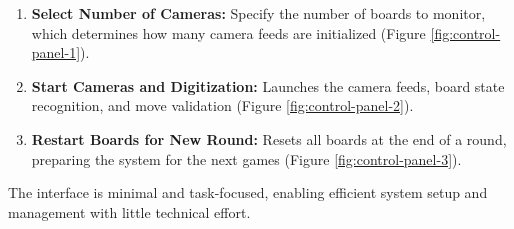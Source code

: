 \begin{enumerate}
\item \textbf{Select Number of Cameras:} Specify the number of boards to monitor, which determines how many camera feeds are initialized (Figure \ref{fig:control-panel-1}).
\item \textbf{Start Cameras and Digitization:} Launches the camera feeds, board state recognition, and move validation (Figure \ref{fig:control-panel-2}).
\item \textbf{Restart Boards for New Round:} Resets all boards at the end of a round, preparing the system for the next games (Figure \ref{fig:control-panel-3}).
\end{enumerate}

The interface is minimal and task-focused, enabling efficient system setup and management with little technical effort. \\

\newpage

